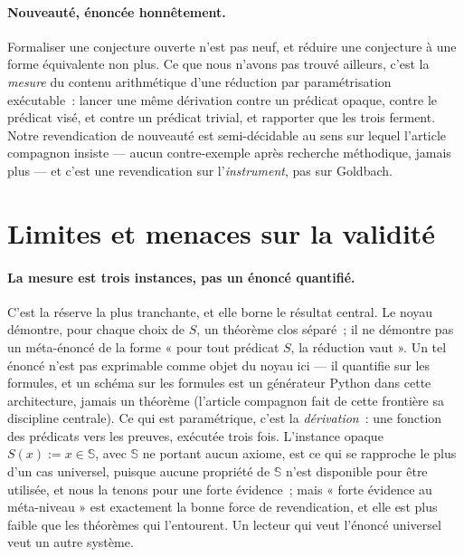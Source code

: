 \documentclass[11pt]{article}
\theoremstyle{remark}\newtheorem{remarque}{Remarque}
\begin{document}
\paragraph{Nouveauté, énoncée honnêtement.} Formaliser une conjecture ouverte n'est pas
neuf, et réduire une conjecture à une forme équivalente non plus. Ce que nous n'avons pas
trouvé ailleurs, c'est la \emph{mesure} du contenu arithmétique d'une réduction par
paramétrisation exécutable~: lancer une même dérivation contre un prédicat opaque, contre
le prédicat visé, et contre un prédicat trivial, et rapporter que les trois ferment.
Notre revendication de nouveauté est semi-décidable au sens sur lequel l'article compagnon
insiste --- aucun contre-exemple après recherche méthodique, jamais plus --- et c'est une
revendication sur l'\emph{instrument}, pas sur Goldbach.

\section{Limites et menaces sur la validité}
\label{sec:limitations}

\paragraph{La mesure est trois instances, pas un énoncé quantifié.} C'est la réserve la
plus tranchante, et elle borne le résultat central. Le noyau démontre, pour chaque choix
de $S$, un théorème clos séparé~; il ne démontre pas un méta-énoncé de la forme « pour
tout prédicat $S$, la réduction vaut ». Un tel énoncé n'est pas exprimable comme objet du
noyau ici --- il quantifie sur les formules, et un schéma sur les formules est un
générateur Python dans cette architecture, jamais un théorème (l'article compagnon fait
de cette frontière sa discipline centrale). Ce qui est paramétrique, c'est la
\emph{dérivation}~: une fonction des prédicats vers les preuves, exécutée trois fois.
L'instance opaque $S(x) := x \in \mathbb{S}$, avec $\mathbb{S}$ ne portant aucun axiome,
est ce qui se rapproche le plus d'un cas universel, puisque aucune propriété de
$\mathbb{S}$ n'est disponible pour être utilisée, et nous la tenons pour une forte
évidence~; mais « forte évidence au méta-niveau » est exactement la bonne force de
revendication, et elle est plus faible que les théorèmes qui l'entourent. Un lecteur qui
veut l'énoncé universel veut un autre système.
\end{document}
